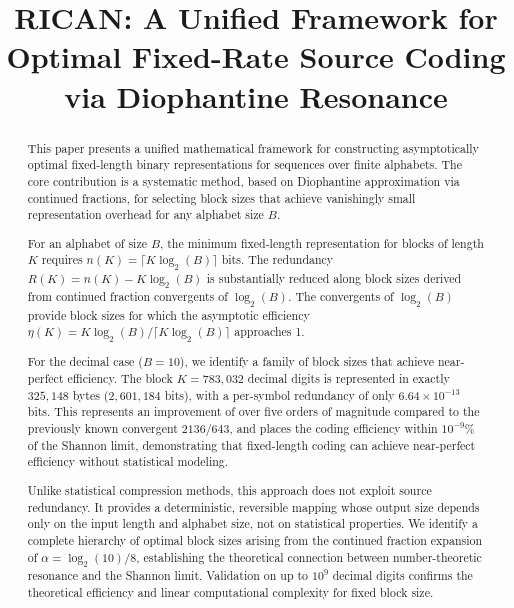 \documentclass[10pt, onecolumn]{IEEEtran}
\begin{document}
\title{RICAN: A Unified Framework for Optimal Fixed-Rate Source Coding via Diophantine Resonance}

\author{
}

\maketitle

\begin{abstract}
This paper presents a unified mathematical framework for constructing asymptotically optimal fixed-length binary representations for sequences over finite alphabets. The core contribution is a systematic method, based on Diophantine approximation via continued fractions, for selecting block sizes that achieve vanishingly small representation overhead for any alphabet size $B$.

For an alphabet of size $B$, the minimum fixed-length representation for blocks of length $K$ requires $n(K)=\lceil K\log_2(B)\rceil$ bits. The redundancy $R(K)=n(K)-K\log_2(B)$ is substantially reduced along block sizes derived from continued fraction convergents of $\log_2(B)$. The convergents of $\log_2(B)$ provide block sizes for which the asymptotic efficiency $\eta(K)=K\log_2(B)/\lceil K\log_2(B)\rceil$ approaches 1.

For the decimal case ($B=10$), we identify a family of block sizes that achieve near-perfect efficiency. The block $K=783,032$ decimal digits is represented in exactly $325,148$ bytes ($2,601,184$ bits), with a per-symbol redundancy of only $6.64\times10^{-13}$ bits. This represents an improvement of over five orders of magnitude compared to the previously known convergent $2136/643$, and places the coding efficiency within $10^{-9}\%$ of the Shannon limit, demonstrating that fixed-length coding can achieve near-perfect efficiency without statistical modeling.

Unlike statistical compression methods, this approach does not exploit source redundancy. It provides a deterministic, reversible mapping whose output size depends only on the input length and alphabet size, not on statistical properties. We identify a complete hierarchy of optimal block sizes arising from the continued fraction expansion of $\alpha = \log_2(10)/8$, establishing the theoretical connection between number-theoretic resonance and the Shannon limit. Validation on up to $10^9$ decimal digits confirms the theoretical efficiency and linear computational complexity for fixed block size.
\end{abstract}
\end{document}
